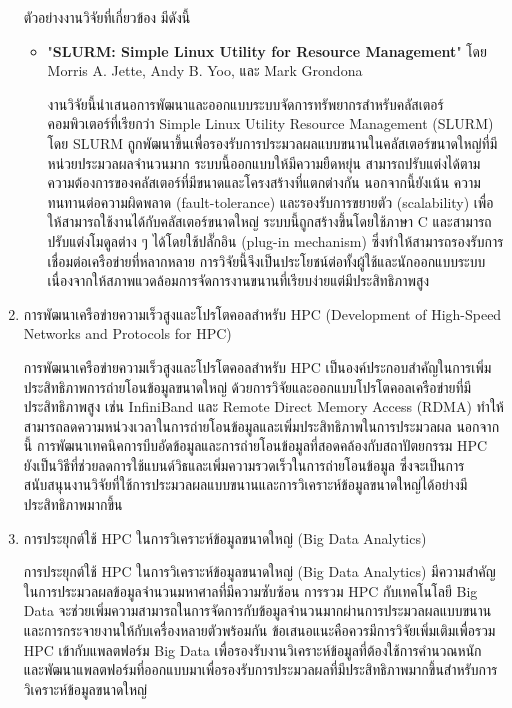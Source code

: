 \documentclass[a4paper,12pt]{extarticle}
\begin{document}
\begin{enumerate}
	ตัวอย่างงานวิจัยที่เกี่ยวข้อง มีดังนี้
	\begin{itemize}
		\item "\textbf{SLURM: Simple Linux Utility for Resource Management}" โดย Morris A. Jette, Andy B. Yoo, และ Mark Grondona

		งานวิจัยนี้นำเสนอการพัฒนาและออกแบบระบบจัดการทรัพยากรสำหรับคลัสเตอร์คอมพิวเตอร์ที่เรียกว่า Simple Linux Utility Resource Management (SLURM) โดย SLURM ถูกพัฒนาขึ้นเพื่อรองรับการประมวลผลแบบขนานในคลัสเตอร์ขนาดใหญ่ที่มีหน่วยประมวลผลจำนวนมาก ระบบนี้ออกแบบให้มีความยืดหยุ่น สามารถปรับแต่งได้ตามความต้องการของคลัสเตอร์ที่มีขนาดและโครงสร้างที่แตกต่างกัน นอกจากนี้ยังเน้น ความทนทานต่อความผิดพลาด (fault-tolerance) และรองรับการขยายตัว (scalability) เพื่อให้สามารถใช้งานได้กับคลัสเตอร์ขนาดใหญ่ ระบบนี้ถูกสร้างขึ้นโดยใช้ภาษา C และสามารถปรับแต่งโมดูลต่าง ๆ ได้โดยใช้ปลั๊กอิน (plug-in mechanism) ซึ่งทำให้สามารถรองรับการเชื่อมต่อเครือข่ายที่หลากหลาย การวิจัยนี้จึงเป็นประโยชน์ต่อทั้งผู้ใช้และนักออกแบบระบบ เนื่องจากให้สภาพแวดล้อมการจัดการงานขนานที่เรียบง่ายแต่มีประสิทธิภาพสูง
	\end{itemize}

	\item การพัฒนาเครือข่ายความเร็วสูงและโปรโตคอลสำหรับ HPC (Development of High-Speed Networks and Protocols for HPC) %

	การพัฒนาเครือข่ายความเร็วสูงและโปรโตคอลสำหรับ HPC เป็นองค์ประกอบสำคัญในการเพิ่มประสิทธิภาพการถ่ายโอนข้อมูลขนาดใหญ่ ด้วยการวิจัยและออกแบบโปรโตคอลเครือข่ายที่มีประสิทธิภาพสูง เช่น InfiniBand และ Remote Direct Memory Access (RDMA) ทำให้สามารถลดความหน่วงเวลาในการถ่ายโอนข้อมูลและเพิ่มประสิทธิภาพในการประมวลผล นอกจากนี้ การพัฒนาเทคนิคการบีบอัดข้อมูลและการถ่ายโอนข้อมูลที่สอดคล้องกับสถาปัตยกรรม HPC ยังเป็นวิธีที่ช่วยลดการใช้แบนด์วิธและเพิ่มความรวดเร็วในการถ่ายโอนข้อมูล ซึ่งจะเป็นการสนับสนุนงานวิจัยที่ใช้การประมวลผลแบบขนานและการวิเคราะห์ข้อมูลขนาดใหญ่ได้อย่างมีประสิทธิภาพมากขึ้น

	\item การประยุกต์ใช้ HPC ในการวิเคราะห์ข้อมูลขนาดใหญ่ (Big Data Analytics) %

	การประยุกต์ใช้ HPC ในการวิเคราะห์ข้อมูลขนาดใหญ่ (Big Data Analytics) มีความสำคัญในการประมวลผลข้อมูลจำนวนมหาศาลที่มีความซับซ้อน การรวม HPC กับเทคโนโลยี Big Data จะช่วยเพิ่มความสามารถในการจัดการกับข้อมูลจำนวนมากผ่านการประมวลผลแบบขนานและการกระจายงานให้กับเครื่องหลายตัวพร้อมกัน ข้อเสนอแนะคือควรมีการวิจัยเพิ่มเติมเพื่อรวม HPC เข้ากับแพลตฟอร์ม Big Data เพื่อรองรับงานวิเคราะห์ข้อมูลที่ต้องใช้การคำนวณหนัก และพัฒนาแพลตฟอร์มที่ออกแบบมาเพื่อรองรับการประมวลผลที่มีประสิทธิภาพมากขึ้นสำหรับการวิเคราะห์ข้อมูลขนาดใหญ่

\end{enumerate}
\end{document}
